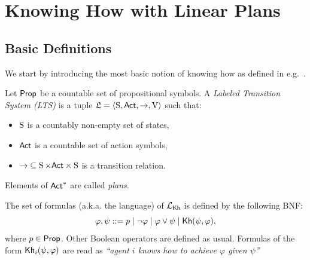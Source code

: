 \section{Knowing How with Linear Plans}
\label{sec:khlinearplans}

\subsection{Basic Definitions}

We start by introducing the most basic notion of knowing how as defined in e.g.~\cite{Wang15lori,Wang16,Wang2016}.


\begin{definition}\label{def:lts}
    Let $\PROP$ be a countable set of propositional symbols. 
    A \emph{Labeled Transition System (LTS)}  is a tuple
    $\model=\tup{\S,\ACT,\ra,\V}$ such that:
    \begin{itemize}
        \item $\S$ is a countably non-empty set of states,
        \item $\ACT$ is a countable set of action symbols,
        \item ${\ra} \subseteq \S \times \ACT \times \S$ is a transition relation.
    \end{itemize}
    Elements of $\ACT^*$ are called \emph{plans}.
\end{definition}

\begin{definition}
    \label{def:syntax}
    The set of formulas (a.k.a. the language) of $\Khlogic$ is defined by the following BNF:
    \[
        \varphi, \psi ::= p \mid \neg \varphi \mid \varphi \vee \psi \mid \kh(\psi,\varphi),
    \]
    where $p\in\PROP$. Other Boolean operators are defined as usual. Formulas of the form $\kh_i(\psi,\varphi)$ are read as \emph{``agent $i$ knows how to achieve $\varphi$ given $\psi$''}
\end{definition}


